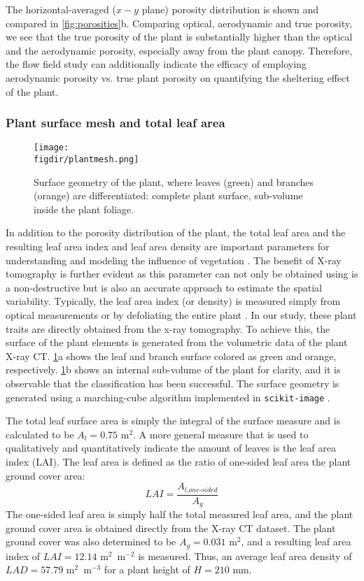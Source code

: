 The horizontal-averaged ($x-y$ plane) porosity distribution is shown and compared in \cref{fig:porosities}b. Comparing optical, aerodynamic and true porosity, we see that the true porosity of the plant is substantially higher than the optical and the aerodynamic porosity, especially away from the plant canopy. Therefore, the flow field study can additionally indicate the efficacy of employing aerodynamic porosity vs. true plant porosity on quantifying the sheltering effect of the plant. 

\subsubsection*{Plant surface mesh and total leaf area}

\begin{figure}[t]
	\centering
	\texttt{[image: \\figdir/plantmesh.png]}
	\caption{Surface geometry of the plant, where leaves (green) and branches (orange) are differentiated:  complete plant surface,  sub-volume inside the plant foliage.}
	\label{fig:plantmesh}
\end{figure}

In addition to the porosity distribution of the plant, the total leaf area and the resulting leaf area index and leaf area density are important parameters for understanding and modeling the influence of vegetation \citep{Manickathan2018a}. The benefit of X-ray tomography is further evident as this parameter can not only be obtained using is a non-destructive but is also an accurate approach to estimate the spatial variability. Typically, the leaf area index (or density) is measured simply from optical measurements or by defoliating the entire plant \citep{Guan2003,Jonckheere2004,Manickathan2018b}. In our study, these plant traits are directly obtained from the x-ray tomography. To achieve this, the surface of the plant elements is generated from the volumetric data of the plant X-ray CT. \cref{fig:plantmesh}a shows the leaf and branch surface colored as green and orange, respectively. \cref{fig:plantmesh}b shows an internal sub-volume of the plant for clarity, and it is observable that the classification has been successful. The surface geometry is generated using a marching-cube algorithm implemented in \texttt{scikit-image} \citep{VanderWalt2014a}.

The total leaf surface area is simply the integral of the surface measure and is calculated to be $A_l=0.75$ m$^2$. A more general measure that is used to qualitatively and quantitatively indicate the amount of leaves is the leaf area index (LAI). The leaf area is defined as the ratio of one-sided leaf area the plant ground cover area:
\begin{equation}
\textit{LAI} = \frac{A_{\textit{l,one-sided}}}{A_g}
\end{equation}
The one-sided leaf area is simply half the total measured leaf area, and the plant ground cover area is obtained directly from the X-ray CT dataset. The plant ground cover was also determined to be $A_g=0.031$ m$^2$, and a resulting leaf area index of $LAI=12.14$ m$^2$~m$^{-2}$ is measured. Thus, an average leaf area density of $LAD=57.79$ m$^2$~m$^{-3}$ for a plant height of $H=210$ mm.

